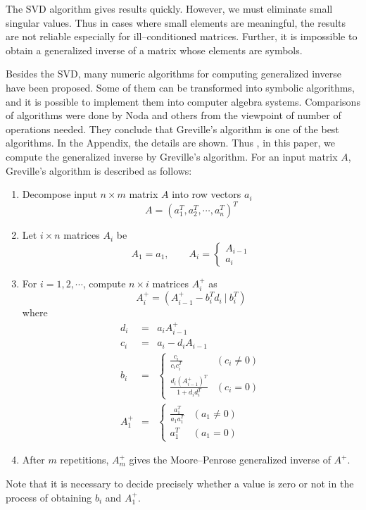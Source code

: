 The SVD algorithm gives results quickly.  However, 
we must eliminate small singular values.  Thus in cases 
where small elements are meaningful, the results are not 
reliable especially for ill--conditioned matrices.  
Further, it is impossible to obtain a generalized inverse 
of a matrix whose elements are symbols. \par
Besides the SVD, many numeric algorithms for computing 
generalized inverse have been proposed.  Some of them 
can be transformed into symbolic algorithms, and it is 
possible to implement them into computer algebra systems.  
Comparisons of algorithms were done by Noda and others 
\cite{No89,MS95} from the viewpoint of number of operations 
needed.  They conclude that Greville's algorithm \cite{Gr60} 
is one of the best algorithms.  In the Appendix, the details 
are shown.  Thus , in this paper, we compute the generalized 
inverse by Greville's algorithm.  
For an input matrix $A$, Greville's algorithm is described as follows:
\begin{enumerate}
\item Decompose input $n \times m $ matrix $A $ into 
row vectors $a_i $ 
$$ A=( a_1^T,a_2^T, \cdots, a_n^T )^T $$
\item Let $i \times n $ matrices $A_i $ be
$$ A_1 = a_1, \qquad A_i = \left\{ \begin{array}{c}
A_{i-1} \\ a_i \end{array} \right. $$
\item For $i = 1,2, \cdots $, compute $n \times i $ 
matrices $A_i^+ $ as
$$ A_i^+ = ( A_{i-1}^+ - b_i^Td_i \ | \ b_i^T ) $$
where
\begin{eqnarray*}
d_i &=& a_i A_{i-1}^+ \\
c_i &=& a_i - d_i A_{i-1} \\
b_i &=& \left\{ \begin{array}{ll}
\frac{c_i}{c_i c_i^T} & ( c_i \neq 0 ) \\
\frac{d_i(A_{i-1}^+)^T}{1+d_id_i^T} & ( c_i = 0 )
\end{array} \right. \\
A_1^+ &=& \left\{ \begin{array}{ll}
\frac{a_1^T}{a_1 a_1^T} & ( a_1 \neq 0 ) \\ a_1^T & ( a_1 = 0
)\end{array} \right.
\end{eqnarray*}
\item After $m $ repetitions, $A_m^+ $ gives the 
Moore--Penrose generalized inverse of $A^+ $.
\end{enumerate} 
Note that it is necessary to decide precisely whether a value is 
zero or not in the process of obtaining $b_i $ and $A_1^+ $.

